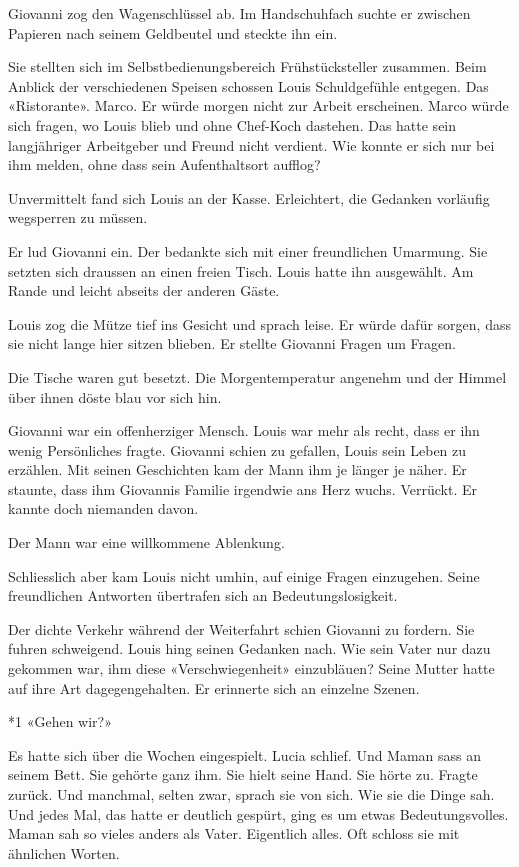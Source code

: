 Giovanni zog den Wagenschlüssel ab. Im Handschuhfach suchte er zwischen
Papieren nach seinem Geldbeutel und steckte ihn ein.

Sie stellten sich im Selbstbedienungsbereich Frühstücksteller zusammen.
Beim Anblick der verschiedenen Speisen schossen Louis Schuldgefühle
entgegen. Das «Ristorante». Marco. Er würde morgen nicht zur Arbeit
erscheinen. Marco würde sich fragen, wo Louis blieb und ohne Chef-Koch
dastehen. Das hatte sein langjähriger Arbeitgeber und Freund nicht
verdient. Wie konnte er sich nur bei ihm melden, ohne dass sein
Aufenthaltsort aufflog?

Unvermittelt fand sich Louis an der Kasse. Erleichtert, die Gedanken
vorläufig wegsperren zu müssen.

Er lud Giovanni ein. Der bedankte sich mit einer freundlichen Umarmung.
Sie setzten sich draussen an einen freien Tisch. Louis hatte ihn
ausgewählt. Am Rande und leicht abseits der anderen Gäste.

Louis zog die Mütze tief ins Gesicht und sprach leise. Er würde dafür
sorgen, dass sie nicht lange hier sitzen blieben. Er stellte Giovanni
Fragen um Fragen.

Die Tische waren gut besetzt. Die Morgentemperatur angenehm und der
Himmel über ihnen döste blau vor sich hin.

Giovanni war ein offenherziger Mensch. Louis war mehr als recht, dass er
ihn wenig Persönliches fragte. Giovanni schien zu gefallen, Louis sein
Leben zu erzählen. Mit seinen Geschichten kam der Mann ihm je länger je
näher. Er staunte, dass ihm Giovannis Familie irgendwie ans Herz wuchs.
Verrückt. Er kannte doch niemanden davon.

Der Mann war eine willkommene Ablenkung.

Schliesslich aber kam Louis nicht umhin, auf einige Fragen einzugehen.
Seine freundlichen Antworten übertrafen sich an Bedeutungslosigkeit.

Der dichte Verkehr während der Weiterfahrt schien Giovanni zu fordern.
Sie fuhren schweigend. Louis hing seinen Gedanken nach. Wie sein Vater
nur dazu gekommen war, ihm diese «Verschwiegenheit» einzubläuen? Seine
Mutter hatte auf ihre Art dagegengehalten. Er erinnerte sich an einzelne
Szenen.

*1 «Gehen wir?»

Es hatte sich über die Wochen eingespielt. Lucia schlief. Und Maman sass
an seinem Bett. Sie gehörte ganz ihm. Sie hielt seine Hand. Sie hörte
zu. Fragte zurück. Und manchmal, selten zwar, sprach sie von sich. Wie
sie die Dinge sah. Und jedes Mal, das hatte er deutlich gespürt, ging es
um etwas Bedeutungsvolles. Maman sah so vieles anders als Vater.
Eigentlich alles. Oft schloss sie mit ähnlichen Worten.

